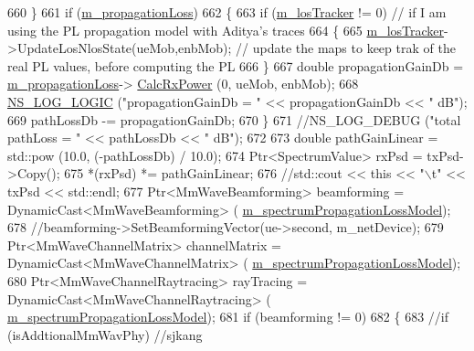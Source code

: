 \begin{DoxyCode}
660                 \}
661                 \textcolor{keywordflow}{if} (\hyperlink{classns3_1_1MmWavePhy_ae16faa8d6eeee2cc0cc712b0ccb62064}{m\_propagationLoss})
662                 \{
663                         \textcolor{keywordflow}{if} (\hyperlink{classns3_1_1MmWavePhy_a614158bb98ad735dc185e0d6eccc51a0}{m\_losTracker} != 0) \textcolor{comment}{// if I am using the PL propagation model with
       Aditya's traces}
664                         \{
665                                 \hyperlink{classns3_1_1MmWavePhy_a614158bb98ad735dc185e0d6eccc51a0}{m\_losTracker}->UpdateLosNlosState(ueMob,enbMob); \textcolor{comment}{// update the
       maps to keep trak of the real PL values, before computing the PL}
666                         \}
667                   \textcolor{keywordtype}{double} propagationGainDb = \hyperlink{classns3_1_1MmWavePhy_ae16faa8d6eeee2cc0cc712b0ccb62064}{m\_propagationLoss}->
      \hyperlink{classns3_1_1PropagationLossModel_a8b42564e9b03e2197f17aab6692c4fee}{CalcRxPower} (0, ueMob, enbMob);
668                   \hyperlink{group__logging_ga88acd260151caf2db9c0fc84997f45ce}{NS\_LOG\_LOGIC} (\textcolor{stringliteral}{"propagationGainDb = "} << propagationGainDb << \textcolor{stringliteral}{" dB"});
669                   pathLossDb -= propagationGainDb;
670                 \}                    
671                 \textcolor{comment}{//NS\_LOG\_DEBUG ("total pathLoss = " << pathLossDb << " dB");    }
672 
673                 \textcolor{keywordtype}{double} pathGainLinear = std::pow (10.0, (-pathLossDb) / 10.0);
674                 Ptr<SpectrumValue> rxPsd = txPsd->Copy();
675                 *(rxPsd) *= pathGainLinear;              
676                 \textcolor{comment}{//std::cout << this  << "\(\backslash\)t" << txPsd << std::endl;}
677                 Ptr<MmWaveBeamforming> beamforming = DynamicCast<MmWaveBeamforming> (
      \hyperlink{classns3_1_1MmWavePhy_a3d7feea996066a51496915c8c232daa4}{m\_spectrumPropagationLossModel});
678                 \textcolor{comment}{//beamforming->SetBeamformingVector(ue->second, m\_netDevice);}
679                 Ptr<MmWaveChannelMatrix> channelMatrix = DynamicCast<MmWaveChannelMatrix> (
      \hyperlink{classns3_1_1MmWavePhy_a3d7feea996066a51496915c8c232daa4}{m\_spectrumPropagationLossModel});
680                 Ptr<MmWaveChannelRaytracing> rayTracing = DynamicCast<MmWaveChannelRaytracing> (
      \hyperlink{classns3_1_1MmWavePhy_a3d7feea996066a51496915c8c232daa4}{m\_spectrumPropagationLossModel});
681                 \textcolor{keywordflow}{if} (beamforming != 0)
682                 \{
683                         \textcolor{comment}{//if (isAddtionalMmWavPhy) //sjkang}

\end{DoxyCode}
